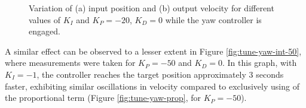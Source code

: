 \begin{figure}
  \centering
  \caption{Variation of (a) input position and (b) output velocity for different values of $K_{I}$ and $K_P=-20$, $K_D=0$ while the yaw controller is engaged.}\label{fig:tune-yaw-int-20}
\end{figure}

A similar effect can be observed to a lesser extent in Figure \ref{fig:tune-yaw-int-50}, where measurements were taken for $K_{P}=-50$ and $K_{D}=0$. In this graph, with $K_{I}=-1$, the controller reaches the target position approximately 3 seconds faster, exhibiting similar oscillations in velocity compared to exclusively using of the proportional term (Figure \ref{fig:tune-yaw-prop}, for $K_{P}=-50$).

